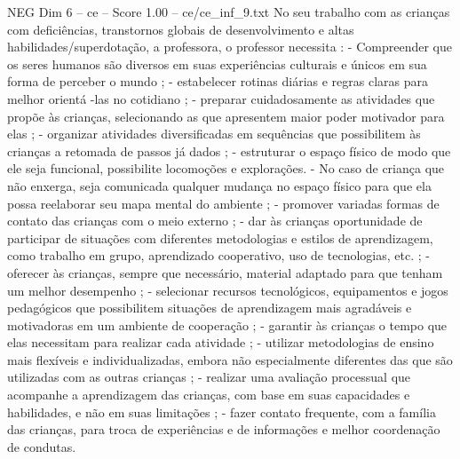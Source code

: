 \begin{textsample}{NEG Dim 6 – ce – Score 1.00 – ce/ce\_inf\_9.txt}
No seu trabalho com as crianças com deficiências, transtornos globais de desenvolvimento e altas habilidades/superdotação, a professora, o professor necessita : - Compreender que os seres humanos são diversos em suas experiências culturais e únicos em sua forma de perceber o mundo ; - estabelecer rotinas diárias e regras claras para melhor orientá -las no cotidiano ; - preparar cuidadosamente as atividades que propõe às crianças, selecionando as que apresentem maior poder motivador para elas ; - organizar atividades diversificadas em sequências que possibilitem às crianças a retomada de passos já dados ; - estruturar o espaço físico de modo que ele seja funcional, possibilite locomoções e explorações. - No caso de criança que não enxerga, seja comunicada qualquer mudança no espaço físico para que ela possa reelaborar seu mapa mental do ambiente ; - promover variadas formas de contato das crianças com o meio externo ; - dar às crianças oportunidade de participar de situações com diferentes metodologias e estilos de aprendizagem, como trabalho em grupo, aprendizado cooperativo, uso de tecnologias, etc. ; - oferecer às crianças, sempre que necessário, material adaptado para que tenham um melhor desempenho ; - selecionar recursos tecnológicos, equipamentos e jogos pedagógicos que possibilitem situações de aprendizagem mais agradáveis e motivadoras em um ambiente de cooperação ; - garantir às crianças o tempo que elas necessitam para realizar cada atividade ; - utilizar metodologias de ensino mais flexíveis e individualizadas, embora não especialmente diferentes das que são utilizadas com as outras crianças ; - realizar uma avaliação processual que acompanhe a aprendizagem das crianças, com base em suas capacidades e habilidades, e não em suas limitações ; - fazer contato frequente, com a família das crianças, para troca de experiências e de informações e melhor coordenação de condutas.

\end{textsample}
